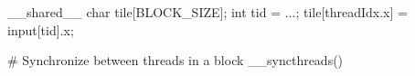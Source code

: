 

__shared__ char tile[BLOCK_SIZE];
int tid = ...;
tile[threadIdx.x] = input[tid].x;



# Synchronize between threads in a block
__syncthreads()